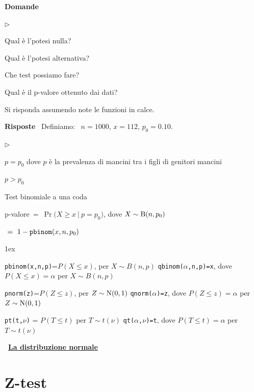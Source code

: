 \documentclass[11pt,openany]{book}
\newcommand{\mylabel}[1]{{\footnotesize\textsf{#1}}\hfill}
\renewenvironment{itemize}
  {\begin{list}{$\triangleright$}{%
   \setlength{\parskip}{0mm}
   \setlength{\topsep}{.2\baselineskip}
   \setlength{\rightmargin}{0mm}
   \setlength{\listparindent}{0mm}
   \setlength{\itemindent}{0mm}
   \setlength{\labelwidth}{3ex}
   \setlength{\itemsep}{.4\baselineskip}
   \setlength{\parsep}{0mm}
   \setlength{\partopsep}{0mm}
   \setlength{\labelsep}{1ex}
   \setlength{\leftmargin}{\labelwidth+\labelsep}
   \let\makelabel\mylabel}}{%
   \end{list}\vspace*{-1.3mm}}
\begin{document}
\textbf{Domande}

\begin{itemize}
\item[1.] Qual è l'potesi nulla?

\item[2.] Qual è l'potesi alternativa?

\item[3.] Che test possiamo fare?

\item[4.] Qual è il p-valore ottenuto dai dati?
\end{itemize}
Si risponda assumendo note le funzioni in calce.

\textbf{Risposte} \ Definiamo: \ $n=1000$,\quad
$x=112$,\quad
$p_0=0.10$.

\begin{itemize}
\item[1.] $p=p_0$ dove $p$ è la prevalenza di mancini tra i figli di genitori mancini
\item[2.]  $p>p_0$ 
\item[3.] Test binomiale a una coda
\item[4.] 


p-valore$\ =\ \Pr\big(X\ge x\ \mathbin\big|\ p=p_0\big)$, dove $X\sim{\rm B}(n,p_0)$ \medskip

\phantom{p-valore}$\ =\ 1 -{\tt  pbinom}(x,n,p_0)$
\end{itemize}


\vfill
\parskip1ex
{\hrulefill\scriptsize

{\tt pbinom(x,n,p)}=$P(X\le x)$, per $X\sim B(n,p)$
\hfill 
{\tt qbinom($\alpha$,n,p)=x},  dove $P(X\le x)=\alpha$ per $X\sim B(n,p)$

{\tt pnorm(z)}=$P(Z\le z)$, per $Z\sim {\rm N}(0,1)$
\hfill 
{\tt qnorm($\alpha$)=z},  dove $P(Z\le z)=\alpha$ per $Z\sim {\rm N}(0,1)$

{\tt pt(t,$\nu$)} = $P(T\le t)$ per $T\sim t(\nu)$
\hfill
{\tt qt($\alpha$,$\nu$)=t}, dove $P(T\le t)=\alpha$ per $T\sim t(\nu)$

}


\clearpage\
\hfill\textbf{{\color{brown}\hyperref[distribuzione normale]{La distribuzione normale \faShare}}}
\section{Z-test}
\label{Z-test}
\end{document}
